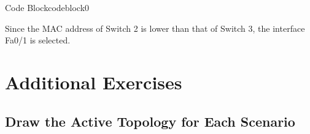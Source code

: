 \documentclass[a4paper]{book}
\begin{document}
\begin{enumerate}
\begin{itemize}
\begin{ocg}{Code Block}{codeblock}{0}
\begin{tcolorbox}
{        Since the MAC address of Switch 2 is lower than that of Switch 3, the interface Fa0/1 is selected.
}
\end{tcolorbox}
\end{ocg}

    \end{itemize}

    
\end{enumerate}

\newpage
\section*{Additional Exercises}

\subsection*{Draw the Active Topology for Each Scenario}
\end{document}
